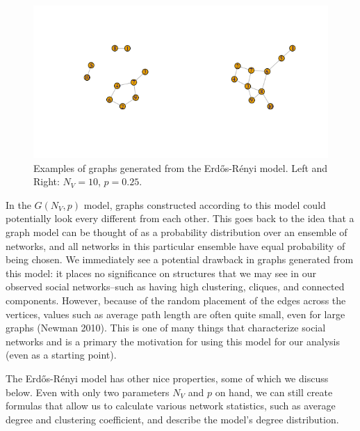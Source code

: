 \documentclass[12pt,twoside]{amherstthesis}
\begin{document}
  \begin{figure}[htbp]
  \centering
  \includegraphics{figure/21erdosrenyiexample.png}
  \caption{Examples of graphs generated from the Erdős-Rényi model. Left
  and Right: \(N_V = 10\), \(p = 0.25\).}
  \end{figure}
  
  In the \(G(N_{V}, p)\) model, graphs constructed according to this model
  could potentially look every different from each other. This goes back
  to the idea that a graph model can be thought of as a probability
  distribution over an ensemble of networks, and all networks in this
  particular ensemble have equal probability of being chosen. We
  immediately see a potential drawback in graphs generated from this
  model: it places no significance on structures that we may see in our
  observed social networks--such as having high clustering, cliques, and
  connected components. However, because of the random placement of the
  edges across the vertices, values such as average path length are often
  quite small, even for large graphs (Newman 2010). This is one of many
  things that characterize social networks and is a primary the motivation
  for using this model for our analysis (even as a starting point).
  
  The Erdős-Rényi model has other nice properties, some of which we
  discuss below. Even with only two parameters \(N_{V}\) and \(p\) on
  hand, we can still create formulas that allow us to calculate various
  network statistics, such as average degree and clustering coefficient,
  and describe the model's degree distribution.
  
\end{document}
